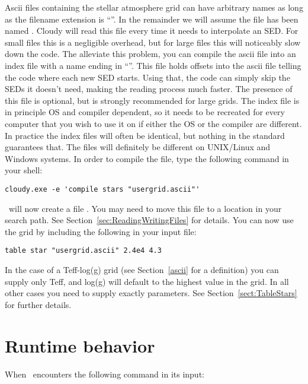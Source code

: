 Ascii files containing the stellar atmosphere grid can have arbitrary names as
long as the filename extension is ``''. In the remainder we
will assume the file has been named . Cloudy will
read this file every time it needs to interpolate an SED. For small files this
is a negligible overhead, but for large files this will noticeably slow down
the code. The alleviate this problem, you can compile the ascii file into an
index file with a name ending in ``''. This file holds
offsets into the ascii file telling the code where each new SED starts. Using
that, the code can simply skip the SEDs it doesn't need, making the reading
process much faster. The presence of this file is optional, but is strongly
recommended for large grids. The index file is in principle OS and compiler
dependent, so it needs to be recreated for every computer that you wish to use
it on if either the OS or the compiler are different. In practice the index
files will often be identical, but nothing in the standard guarantees that.
The files will definitely be different on UNIX/Linux and Windows systems. In
order to compile the file, type the following command in your shell:

\begin{verbatim}
cloudy.exe -e 'compile stars "usergrid.ascii"'
\end{verbatim}

\noindent
\Cloudy\ will now create a file
. You may need to move this file to a location in
your search path. See Section~\ref{sec:ReadingWritingFiles} for details. You
can now use the grid by including the following in your input file:

\begin{verbatim}
table star "usergrid.ascii" 2.4e4 4.3
\end{verbatim}

In the case of a Teff-log(g) grid (see Section~\ref{ascii} for a definition)
you can supply only Teff, and log(g) will default to the highest value in the
grid. In all other cases you need to supply exactly 
parameters. See Section~\ref{sect:TableStars} for further details.

\section{Runtime behavior}
\label{runtime}

When \Cloudy\ encounters the following command in its input:

